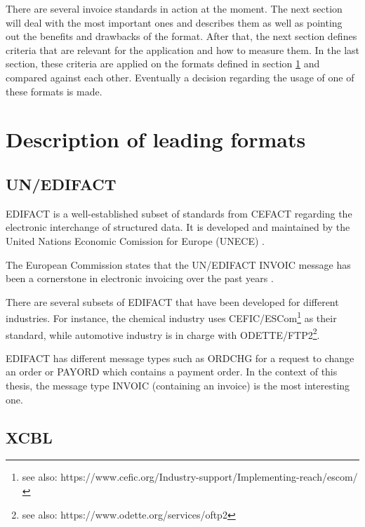 \documentclass[english,mt]{lmedoc}
\begin{document}
There are several invoice standards in action at the moment. The next section will deal with the most important ones and describes them as well as pointing out the benefits and drawbacks of the format.
After that, the next section defines criteria that are relevant for the application and how to measure them.
In the last section, these criteria are applied on the formats defined in section \ref{sec2.1} and compared against each other. Eventually a decision regarding the usage of one of these formats is made.

\section{Description of leading formats}
\label{sec2.1}


\subsection{UN/EDIFACT}
\label{sec2.1.1}

EDIFACT is a well-established \cite{basware} subset of standards from CEFACT regarding the electronic interchange of structured data. It is developed and maintained by the United Nations Economic Comission for Europe (UNECE) \cite{unece}.

The European Commission states that the UN/EDIFACT INVOIC message has been a cornerstone in electronic invoicing over the past years \cite{ECInvcStandardization, page 14}.

There are several subsets of EDIFACT that have been developed for different industries. For instance, the chemical industry uses CEFIC/ESCom\footnote{see also: https://www.cefic.org/Industry-support/Implementing-reach/escom/} as their standard, while automotive industry is in charge with ODETTE/FTP2\footnote{see also: https://www.odette.org/services/oftp2}.

EDIFACT has different message types such as ORDCHG for a request to change an order or PAYORD which contains a payment order. In the context of this thesis, the message type INVOIC (containing an invoice) is the most interesting one.

\subsection{XCBL}
\label{sec2.1.2}
\end{document}
